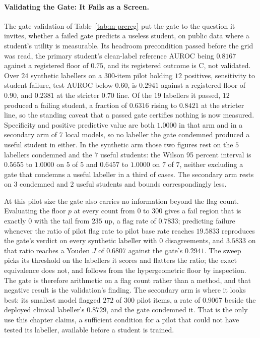 \paragraph{Validating the Gate: It Fails as a Screen.} The gate validation
of Table~\ref{tab:m-prereg} put the gate to the question it invites, whether a
failed gate predicts a useless student, on public data where a student's utility
is measurable. Its headroom precondition passed before the grid was read, the
primary student's clean-label reference AUROC being $0.8167$ against a registered
floor of $0.75$, and its registered outcome is C, not validated. Over $24$
synthetic labellers on a $300$-item pilot holding $12$ positives, sensitivity to
student failure, test AUROC below $0.60$, is $0.2941$ against a registered floor
of $0.90$, and $0.2381$ at the stricter $0.70$ line. Of the $19$ labellers it
passed, $12$ produced a failing student, a fraction of $0.6316$ rising to
$0.8421$ at the stricter line, so the standing caveat that a passed gate certifies nothing
is now measured. Specificity and positive
predictive value are both $1.0000$ in that arm and in a secondary arm of $7$ local
models, so no labeller the gate condemned produced a useful student in either. In the
synthetic arm those two figures rest on the $5$ labellers condemned and the $7$ useful
students: the Wilson 95 percent interval is $0.5655$ to $1.0000$ on $5$ of $5$ and
$0.6457$ to $1.0000$ on $7$ of $7$, neither excluding a gate that condemns a useful
labeller in a third of cases. The secondary arm rests on $3$ condemned and $2$ useful
students and bounds correspondingly less.

At this pilot size the gate also carries no information beyond the flag count. Evaluating the
floor $p$ at every count from $0$ to $300$ gives a fail region that is exactly $0$ with the tail
from $235$ up, a flag rate of $0.7833$; predicting failure whenever the ratio of pilot flag rate
to pilot base rate reaches $19.5833$ reproduces the gate's verdict on every synthetic labeller
with $0$ disagreements, and $3.5833$ on that ratio reaches a Youden $J$ of $0.6807$ against the
gate's $0.2941$. The sweep picks its threshold on the labellers it scores and flatters the ratio;
the exact equivalence does not, and follows from the hypergeometric floor by inspection. The gate
is therefore arithmetic on a flag count rather than a method, and that negative result is the
validation's finding. The secondary arm is where it looks best: its smallest model flagged $272$
of $300$ pilot items, a rate of $0.9067$ beside the deployed clinical labeller's $0.8729$, and the
gate condemned it. That is the only use this chapter claims, a sufficient condition for a pilot
that could not have tested its labeller, available before a student is trained.

